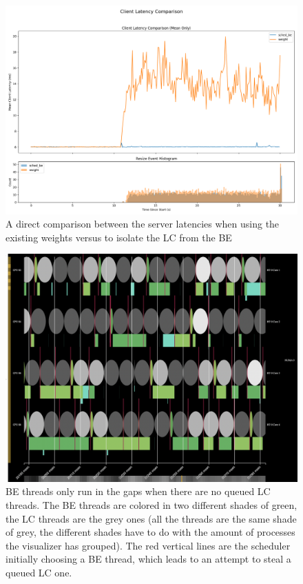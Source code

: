 \begin{figure}[t]
    \centering
    \includegraphics[width=\columnwidth]{graphs/srv-bg-cmp-unedited-schedbe.png}
    \caption{A direct comparison between the server latencies when using the
    existing \cgroups{} weights versus \schedbe{} to isolate the LC from the
    BE}\label{fig:srv-bg-cmp-unedited-schedbe}
\end{figure}

\begin{figure}[t]
    \centering
    \includegraphics[width=\columnwidth]{graphs/schedviz-schedbe.png}
    \caption{BE threads only run in the gaps when there are no queued LC
    threads. The BE threads are colored in two different shades of green, the LC
    threads are the grey ones (all the threads are the same shade of grey, the
    different shades have to do with the amount of processes the visualizer has
    grouped). The red vertical lines are the scheduler initially choosing a BE
    thread, which leads to an attempt to steal a queued LC one.
    }\label{fig:schedviz-schedbe}
\end{figure}


